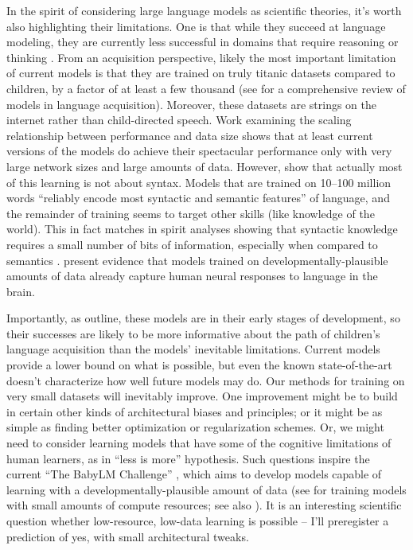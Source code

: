 \documentclass[output=paper,colorlinks,citecolor=brown
]{langscibook}
\begin{document}
In the spirit of considering large language models as scientific theories, it's worth also highlighting their limitations. One is that while they succeed at language modeling, they are currently less successful in domains that require reasoning or thinking \citep{mahowald2023dissociating,lake2021word,barrett2018measuring,collins2022structured}. From an acquisition perspective, likely the most important limitation of current models is that they are trained on truly titanic datasets compared to children, by a factor of at least a few thousand (see \citealt{warstadt2022artificial} for a comprehensive review of models in language acquisition). Moreover, these datasets are strings on the internet rather than child-directed speech. Work examining the scaling relationship between performance and data size shows that at least current versions of the models do achieve their spectacular performance only with very large network sizes and large amounts of data. \citep{kaplan2020scaling} However, \citet{zhang2020you} show that actually most of this learning is not about syntax. Models that are trained on 10--100 million words ``reliably encode most syntactic and semantic features'' of language, and the remainder of training seems to target other skills (like knowledge of the world). This in fact matches in spirit analyses showing that syntactic knowledge requires a small number of bits of information, especially when compared to semantics \citep{mollica2019humans}. \citet{hosseini2022artificial} present evidence that models trained on developmentally-plausible amounts of data already capture human neural responses to language in the brain. 

Importantly, as \citet{warstadt2022artificial} outline, these models are in their early stages of development, so their successes are likely to be more informative about the path of children's language acquisition than the models' inevitable limitations. Current models provide a lower bound on what is possible, but even the known state-of-the-art doesn't characterize how well future models may do. Our methods for training on very small datasets will inevitably improve. One improvement might be to build in certain other kinds of architectural biases and principles; or it might be as simple as finding better optimization or regularization schemes. Or, we might need to consider learning models that have some of the cognitive limitations of human learners, as in  ``less is more'' hypothesis. Such questions inspire the current ``The BabyLM Challenge'' \citep{warstadt2023call}, which aims to develop models capable of learning with a developmentally-plausible amount of data (see \citealt{geiping2022cramming} for training models with small amounts of compute resources; see also \citealt{eldan2023tinystories}). It is an interesting scientific question whether low-resource, low-data learning is possible -- I'll preregister a prediction of yes, with small architectural tweaks.
\end{document}
